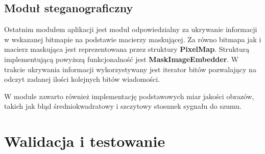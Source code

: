 {{        \subsection{Moduł steganograficzny}
        {
            Ostatnim modułem aplikacji jest moduł odpowiedzialny za ukrywanie informacji w wskazanej bitmapie na
            podstawie macierzy maskującej. Za równo bitmapa jak i macierz maskująca jest reprezentowana przez struktury
            \textbf{PixelMap}. Strukturą implementującą powyższą funkcjonalność jest \textbf{MaskImageEmbedder}. W
            trakcie ukrywania informacji wykorzystywany jest iterator bitów pozwalający na odczyt zadanej ilości
            kolejnych bitów wiadomości.

            W module zawarto również implementację podstawowych miar jakości obrazów, takich jak błąd średniokwadratowy
            i szczytowy stosunek sygnału do szumu.
        }
    }



    \section{Walidacja i testowanie}
    {

    }
}
